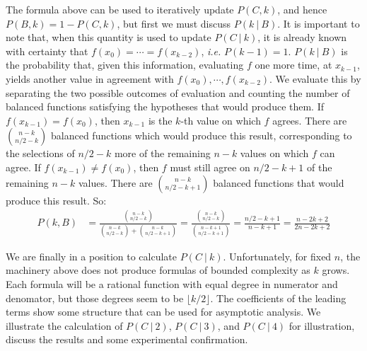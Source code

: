 The formula above can be used to iteratively update $P(C,k)$, and hence $P(B,k)=1-P(C,k)$, but first we must discuss $P(k\ |\ B)$.  It is important to note that, when this quantity is used to update $P(C\ |\ k)$, it is already known with certainty that $f(x_0) = \cdots = f(x_{k-2})$, \textit{i.e.} $P(k-1) = 1$.  $P(k\ |\ B)$ is the probability that, given this information, evaluating $f$ one more time, at $x_{k-1}$, yields another value in agreement with $f(x_0),\cdots,f(x_{k-2})$.   We evaluate this by separating the two possible outcomes of evaluation and counting the number of balanced functions satisfying the hypotheses that would produce them.   If $f(x_{k-1}) =  f(x_0)$, then $x_{k-1}$ is the $k$-th value on which $f$ agrees.  There are $\binom{n-k}{n/2-k}$ balanced functions which would produce this result, corresponding to the selections of $n/2-k$ more of the remaining $n-k$ values on which $f$ can agree.  If $f(x_{k-1})\neq f(x_0)$, then $f$ must still agree on $n/2-k+1$ of the remaining $n-k$ values.  There are $\binom{n-k}{n/2-k+1}$ balanced functions that would produce this result. So:
\begin{align*}
P(k,B)&=\frac{\binom{n-k}{n/2-k}}{\binom{n-k}{n/2-k}+\binom{n-k}{n/2-k+1}} = \frac{\binom{n-k}{n/2-k}}{\binom{n-k+1}{n/2-k+1}} =  \frac{n/2-k+1}{n-k+1} = \frac{n-2k+2}{2n-2k+2}
\end{align*}

We are finally in a position to calculate $P(C\ |\ k)$.  Unfortunately, for fixed $n$, the machinery above does not produce formulas of bounded complexity as $k$ grows.  Each formula will be a rational function with equal degree in numerator and denomator, but those degrees seem to be $\lfloor k/2\rfloor$.  The coefficients of the leading terms show some structure that can be used for asymptotic analysis.  We illustrate the calculation of $P(C\ |\ 2)$, $P(C\ |\ 3)$, and $P(C\ |\ 4)$ for illustration,  discuss the results and some experimental confirmation.

